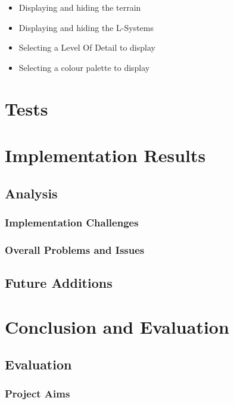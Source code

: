 \documentclass[a4paper,10pt]{report}
\begin{document}
\begin{itemize}
    \item Displaying and hiding the terrain
    \item Displaying and hiding the L-Systems
    \item Selecting a Level Of Detail to display
    \item Selecting a colour palette to display
\end{itemize}

\chapter{Tests}

\chapter{Implementation Results}
\section{Analysis}
\subsection{Implementation Challenges}
\subsection{Overall Problems and Issues}
\section{Future Additions}

\chapter{Conclusion and Evaluation}
\section{Evaluation}
\subsection{Project Aims}


\clearpage


\end{document}
